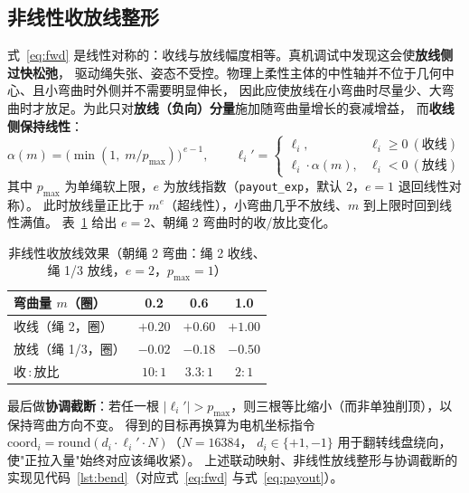 \documentclass[12pt,a4paper]{ctexart}
\newcommand{\code}[1]{\texttt{#1}}
\begin{document}
\subsection{非线性收放线整形}
式~\eqref{eq:fwd} 是线性对称的：收线与放线幅度相等。真机调试中发现这会使\textbf{放线侧过快松弛}，
驱动绳失张、姿态不受控。物理上柔性主体的中性轴并不位于几何中心、且小弯曲时外侧并不需要明显伸长，
因此应使放线在小弯曲时尽量少、大弯曲时才放足。为此只对\textbf{放线（负向）分量}施加随弯曲量增长的衰减增益，
而\textbf{收线侧保持线性}：
\begin{equation}
  \alpha(m)=\Big(\min(1,\;m/p_{\max})\Big)^{\,e-1},\qquad
  \ell_i' = \begin{cases}\ell_i, & \ell_i\ge 0\ (\text{收线})\\[2pt]\ell_i\cdot\alpha(m), & \ell_i<0\ (\text{放线})\end{cases}
  \label{eq:payout}
\end{equation}
其中 $p_{\max}$ 为单绳软上限，$e$ 为放线指数（\code{payout\_exp}，默认 $2$，$e=1$ 退回线性对称）。
此时放线量正比于 $m^{e}$（超线性），小弯曲几乎不放线、$m$ 到上限时回到线性满值。
表~\ref{tab:payout} 给出 $e=2$、朝绳 2 弯曲时的收/放比变化。

\begin{table}[htbp]
\centering
\caption{非线性收放线效果（朝绳 2 弯曲：绳 2 收线、绳 1/3 放线，$e=2$，$p_{\max}=1$）}
\label{tab:payout}
\footnotesize
\begin{tabular}{lccc}
\toprule
弯曲量 $m$（圈） & 0.2 & 0.6 & 1.0 \\
\midrule
收线（绳 2，圈）     & $+0.20$ & $+0.60$ & $+1.00$ \\
放线（绳 1/3，圈）   & $-0.02$ & $-0.18$ & $-0.50$ \\
收\,:\,放比          & $10\!:\!1$ & $3.3\!:\!1$ & $2\!:\!1$ \\
\bottomrule
\end{tabular}
\end{table}

最后做\textbf{协调截断}：若任一根 $|\ell_i'|>p_{\max}$，则三根等比缩小（而非单独削顶），以保持弯曲方向不变。
得到的目标再换算为电机坐标指令 $\mathrm{coord}_i = \mathrm{round}(d_i\cdot \ell_i'\cdot N)$（$N=16384$，
$d_i\in\{+1,-1\}$ 用于翻转线盘绕向，使"正拉入量"始终对应该绳收紧）。
上述联动映射、非线性放线整形与协调截断的实现见代码~\ref{lst:bend}（对应式~\eqref{eq:fwd} 与式~\eqref{eq:payout}）。
\end{document}
